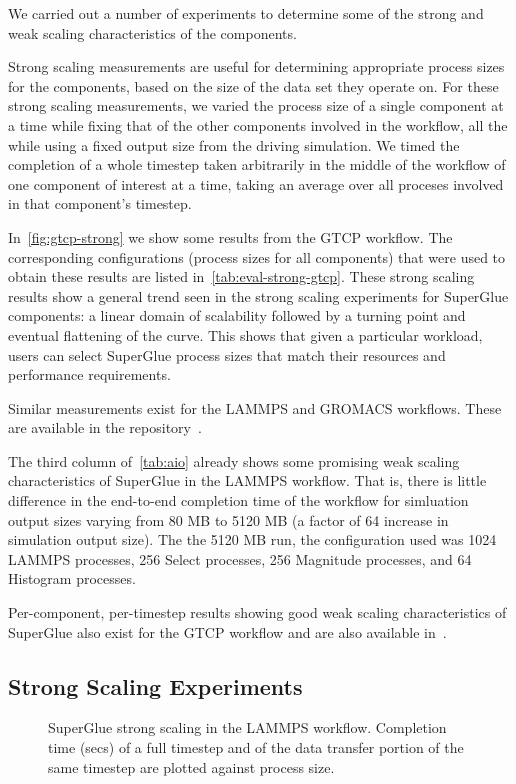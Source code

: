 We carried out a number of experiments
to determine some of the strong and weak scaling
characteristics of the components.

Strong scaling measurements are useful for
determining appropriate process sizes
for the components, based on the size of the
data set they operate on.
For these strong scaling measurements,
we varied the process size of a single component at
a time while fixing that of the
other components involved in the workflow,
all the while using a fixed output size from
the driving simulation.
We timed the completion of a whole timestep
taken arbitrarily in the middle of the workflow
of one component of interest at a time,
taking an average over all proceses
involved in that component's timestep.

In~\autoref{fig:gtcp-strong} we show some results 
from the GTCP workflow.
The corresponding configurations (process sizes for all components)
that were used to obtain these results are listed
in~\autoref{tab:eval-strong-gtcp}.
These strong scaling results show a general trend
seen in the strong scaling experiments for SuperGlue
components: a linear domain of scalability followed
by a turning point and eventual flattening
of the curve. This shows
that given
a particular workload, users can select SuperGlue process sizes
that match their resources and performance requirements.

Similar measurements exist for the LAMMPS and GROMACS workflows.
These are available in the repository~\cite{champsaur:superglue-repo}.

The third column of~\autoref{tab:aio} already
shows some promising
weak scaling characteristics of SuperGlue
in the LAMMPS workflow. That is, there is little
difference in the end-to-end
completion time of the workflow
for simluation output sizes varying
from 80 MB to 5120 MB (a factor of 64
increase in simulation output size).
The the 5120 MB run, the configuration used
was 1024 LAMMPS processes, 256 Select processes,
256 Magnitude processes, and 64 Histogram processes.

Per-component, per-timestep results
showing good weak scaling characteristics of
SuperGlue
also exist for the GTCP workflow and are also
available in~\cite{champsaur:superglue-repo}.

\subsection{Strong Scaling Experiments}


\begin{figure}
  \centering
  \vspace{-0.25in}
  
  \vspace{-0.15in}
  
  \vspace{-0.17in}
  
  \vspace{-0.05in}
  \caption{SuperGlue strong scaling in the LAMMPS workflow.
    Completion time (secs) of a full timestep and of the data transfer
    portion of the same timestep are plotted against process size.}
  \label{fig:lammps-strong}
  \vspace{-0.18in}
\end{figure}

